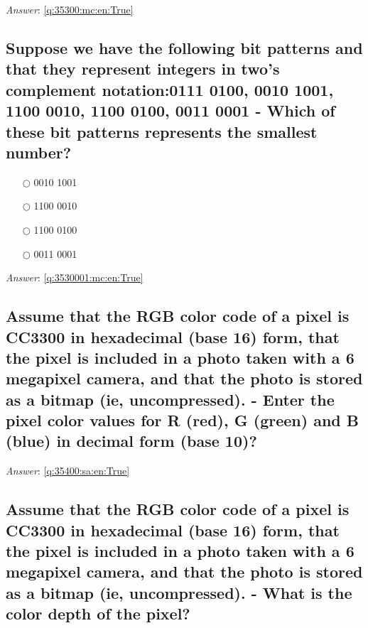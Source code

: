 \documentclass[a4paper,11pt,oneside]{article}
\begin{document}
\begin{sloppypar}
\vspace{1cm}

\textit{Answer}: \autoref{q:35300:mc:en:True}

\subsection{Suppose we have the following bit patterns and that they represent integers in two's complement notation:0111 0100, 0010 1001, 1100 0010, 1100 0100, 0011 0001 - Which of these bit patterns represents the smallest number?}

\label{q:3530001:mc:en:False}

\begin{itemize}
  \item[$\bigcirc$] 0010 1001
  \item[$\bigcirc$] 1100 0010
  \item[$\bigcirc$] 1100 0100
  \item[$\bigcirc$] 0011 0001
\end{itemize}

\vspace{1cm}

\textit{Answer}: \autoref{q:3530001:mc:en:True}



\subsection{Assume that the RGB color code of a pixel is CC3300 in hexadecimal (base 16) form, that the pixel is included in a photo taken with a 6 megapixel camera, and that the photo is stored as a bitmap (ie, uncompressed). - Enter the pixel color values for R (red), G (green) and B (blue) in decimal form (base 10)?}

\label{q:35400:sa:en:False}

\vspace{2cm}

\noindent\makebox[\textwidth]{\hrulefill}

\vspace{1cm}

\textit{Answer}: \autoref{q:35400:sa:en:True}

\subsection{Assume that the RGB color code of a pixel is CC3300 in hexadecimal (base 16) form, that the pixel is included in a photo taken with a 6 megapixel camera, and that the photo is stored as a bitmap (ie, uncompressed). - What is the color depth of the pixel?}


\end{sloppypar}
\end{document}
